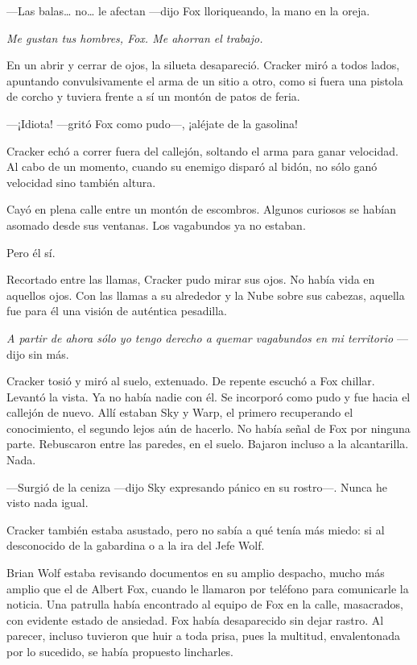 ---Las balas\dots{} no\dots{} le afectan ---dijo Fox lloriqueando, la mano en la oreja.

\emph{Me gustan tus hombres, Fox. Me ahorran el trabajo.}

En un abrir y cerrar de ojos, la silueta desapareció. Cracker miró a todos lados, apuntando convulsivamente el arma de un sitio a otro, como si fuera una pistola de corcho y tuviera frente a sí un montón de patos de feria.

---¡Idiota! ---gritó Fox como pudo---, ¡aléjate de la gasolina!

Cracker echó a correr fuera del callejón, soltando el arma para ganar velocidad. Al cabo de un momento, cuando su enemigo disparó al bidón, no sólo ganó velocidad sino también altura.

Cayó en plena calle entre un montón de escombros. Algunos curiosos se habían asomado desde sus ventanas. Los vagabundos ya no estaban.

Pero él sí.

Recortado entre las llamas, Cracker pudo mirar sus ojos. No había vida en aquellos ojos. Con las llamas a su alrededor y la Nube sobre sus cabezas, aquella fue para él una visión de auténtica pesadilla.

\emph{A partir de ahora sólo yo tengo derecho a quemar vagabundos en mi territorio} ---dijo sin más.

Cracker tosió y miró al suelo, extenuado. De repente escuchó a Fox chillar. Levantó la vista. Ya no había nadie con él. Se incorporó como pudo y fue hacia el callejón de nuevo. Allí estaban Sky y Warp, el primero recuperando el conocimiento, el segundo lejos aún de hacerlo. No había señal de Fox por ninguna parte. Rebuscaron entre las paredes, en el suelo. Bajaron incluso a la alcantarilla. Nada.

---Surgió de la ceniza ---dijo Sky expresando pánico en su rostro---. Nunca he visto nada igual.

Cracker también estaba asustado, pero no sabía a qué tenía más miedo: si al desconocido de la gabardina o a la ira del Jefe Wolf.

Brian Wolf estaba revisando documentos en su amplio despacho, mucho más amplio que el de Albert Fox, cuando le llamaron por teléfono para comunicarle la noticia. Una patrulla había encontrado al equipo de Fox en la calle, masacrados, con evidente estado de ansiedad. Fox había desaparecido sin dejar rastro. Al parecer, incluso tuvieron que huir a toda prisa, pues la multitud, envalentonada por lo sucedido, se había propuesto lincharles.

